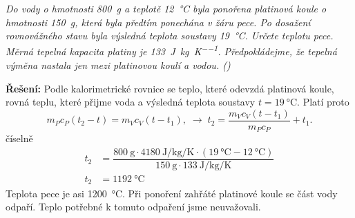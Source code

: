 \begin{mdframed}[style=mdexam]
  \begin{example}\label{FYZ:exam033}
    \emph{Do vody o hmotnosti \qty{800}{\g} a teplotě \qty{12}{\degreeCelsius} byla ponořena platinová
    koule o hmotnosti \qty{150}{\g}, která byla předtím ponechána v žáru pece. Po dosažení
    rovnovážného stavu byla výsledná teplota soustavy \qty{19}{\degreeCelsius}. Určete teplotu pece.
    Měrná tepelná kapacita platiny je \qty{133}{\joule\per\kg\per\kelvin}. Předpokládejme, že tepelná
    výměna nastala jen mezi platinovou koulí a vodou. (\cite[s.~34]{Bartuska1997})}
    
    \textbf{Řešení:}\newline 
    Podle kalorimetrické rovnice se teplo, které odevzdá platinová koule, rovná teplu, které přijme
    voda a výsledná teplota soustavy \(t=\qty{19}{\degreeCelsius}\). Platí proto
    \begin{equation*}
      m_Pc_P(t_2 - t) = m_Vc_V(t-t_1), \;\rightarrow\; t_2 = \dfrac{m_Vc_V(t - t_1)}{m_Pc_P} + t_1.
    \end{equation*}
    číselně
    \begin{align*}
      t_2 &= \dfrac{\qty{800}{\g}\cdot\qty{4180}{\joule\per\kg\per\kelvin}          %
              \cdot(\qty{ 19}{\degreeCelsius} - \qty{12}{\degreeCelsius})}
                   {\qty{150}{\g}\cdot\qty{133}{\joule\per\kg\per\kelvin}}          \\
      t_2 &=\qty{1192}{\degreeCelsius}
    \end{align*}
    Teplota pece je asi \qty{1200}{\degreeCelsius}. Při ponoření zahřáté platinové koule se část vody
    odpaří. Teplo potřebné k tomuto odpaření jsme neuvažovali.  
  \end{example} 
\end{mdframed}